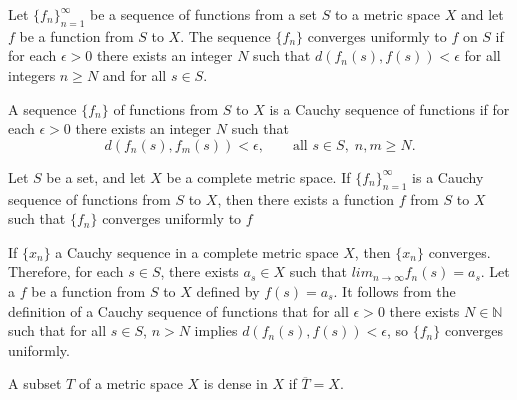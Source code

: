 \documentclass[nobib,notoc]{tufte-handout}
\begin{document}
\begin{defi}
	Let \(\{f_n\}_{n=1}^{\infty}\) be a sequence of functions from a set \(S\) to a metric space \(X\) and let \(f\) be a function from \(S\) to \(X\). The sequence \(\{f_n\}\) converges uniformly to \(f\) on \(S\) if for each \(\epsilon>0\) there exists an integer \(N\) such that \(d(f_n(s),f(s))<\epsilon\) for all integers \(n\geq N\) and for all \(s\in S\).
\end{defi}
\begin{defi}
	A sequence \(\{f_n\}\) of functions from \(S\) to \(X\) is a Cauchy sequence of functions if for each \(\epsilon>0\) there exists an integer \(N\) such that
	\begin{equation*}
		d(f_n(s),f_m(s))<\epsilon,\qquad\text{all }s\in S,\; n,m\geq N.
	\end{equation*}
\end{defi}
\begin{thm}
	Let \(S\) be a set, and let \(X\) be a complete metric space. If \(\{f_n\}_{n=1}^{\infty}\) is a Cauchy sequence of functions from \(S\) to \(X\), then there exists a function \(f\) from \(S\) to \(X\) such that \(\{f_n\}\) converges uniformly to \(f\)
	\begin{IEEEproof}
		If \(\{x_n\}\) a Cauchy sequence in a complete metric space \(X\), then \(\{x_n\}\) converges. Therefore, for each \(s\in S\), there exists \(a_s\in X\) such that \(lim_{n\rightarrow\infty}f_n(s)=a_s\). Let a \(f\) be a function from \(S\) to \(X\) defined by \(f(s)=a_s\). It follows from the definition of a Cauchy sequence of functions that for all \(\epsilon>0\) there exists \(N\in \mathbb{N}\) such that for all \(s\in S\), \(n>N\) implies \(d(f_n(s),f(s))<\epsilon\), so \(\{f_n\}\) converges uniformly.
	\end{IEEEproof}
\end{thm}
\begin{defi}
	A subset \(T\) of a metric space \(X\) is dense in \(X\) if \(\overline{T}=X\).
\end{defi}
\end{document}
